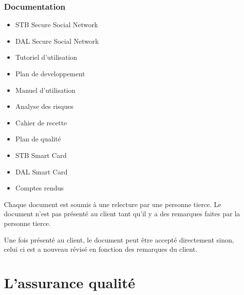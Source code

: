 \documentclass[a4paper,11pt,french]{article}
\begin{document}
\subsubsection{Documentation}
\begin{itemize}
	\item STB Secure Social Network
	\item DAL Secure Social Network
	\item Tutoriel d'utilisation
	\item Plan de developpement
	\item Manuel d'utilisation
	\item Analyse des risques
	\item Cahier de recette
	\item Plan de qualité
	\item STB Smart Card
	\item DAL Smart Card
	\item Comptes rendus
\end{itemize}

	Chaque document est soumis à une relecture par une personne tierce.
Le document n'est pas présenté au client tant qu'il y a des remarques faites
par la personne tierce. 

	Une fois présenté au client, le document peut être accepté directement
sinon, celui ci est a nouveau révisé en fonction des remarques du client.


\newpage
\section{L'assurance qualité}
\end{document}

